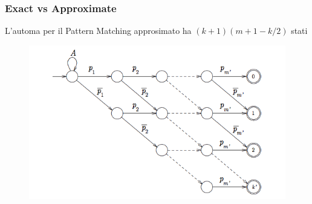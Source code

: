 \documentclass{beamer}
\begin{document}
\begin{frame}
\frametitle{Exact vs Approximate}
\begin{theorem}[]
L'automa per il Pattern Matching approsimato ha $(k+1)(m+1 - k/2)$ stati
\end{theorem}

\begin{figure}[p]
    \includegraphics[scale=0.4]{approssimato.png}
\end{figure}

%

\end{frame}
\end{document}
